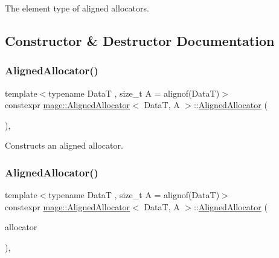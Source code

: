 The element type of aligned allocators. 

\subsection{Constructor \& Destructor Documentation}
\mbox{\label{classmage_1_1_aligned_allocator_ac44b92fc537e8caed25f9aceab419890}} 
\subsubsection{\texorpdfstring{Aligned\+Allocator()}{AlignedAllocator()}\hspace{0.1cm}{\footnotesize\ttfamily [1/4]}}
{\footnotesize\ttfamily template$<$typename DataT , size\+\_\+t A = alignof(\+Data\+T)$>$ \\
constexpr \mbox{\hyperlink{classmage_1_1_aligned_allocator}{mage\+::\+Aligned\+Allocator}}$<$ DataT, A $>$\+::\mbox{\hyperlink{classmage_1_1_aligned_allocator}{Aligned\+Allocator}} (\begin{DoxyParamCaption}{ }\end{DoxyParamCaption})\hspace{0.3cm}{\ttfamily [default]}, {\ttfamily [noexcept]}}

Constructs an aligned allocator. \mbox{\label{classmage_1_1_aligned_allocator_a8dad1465c9c3c36f60f7bf9ca78e5e78}} 
\subsubsection{\texorpdfstring{Aligned\+Allocator()}{AlignedAllocator()}\hspace{0.1cm}{\footnotesize\ttfamily [2/4]}}
{\footnotesize\ttfamily template$<$typename DataT , size\+\_\+t A = alignof(\+Data\+T)$>$ \\
constexpr \mbox{\hyperlink{classmage_1_1_aligned_allocator}{mage\+::\+Aligned\+Allocator}}$<$ DataT, A $>$\+::\mbox{\hyperlink{classmage_1_1_aligned_allocator}{Aligned\+Allocator}} (\begin{DoxyParamCaption}\item[{const \mbox{\hyperlink{classmage_1_1_aligned_allocator}{Aligned\+Allocator}}$<$ DataT, A $>$ \&}]{allocator }\end{DoxyParamCaption})\hspace{0.3cm}{\ttfamily [default]}, {\ttfamily [noexcept]}}

